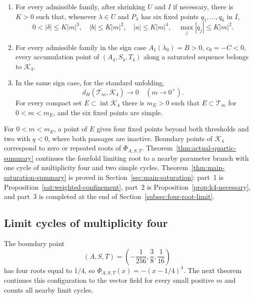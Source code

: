 \begin{theorem}\label{thm:main-saturation-summary}
\label{thm:k4-domain}
\begin{enumerate}
\item For every admissible family, after shrinking $U$ and $I$ if necessary,
there is $K>0$ such that, whenever
$\lambda\in U$ and $P_\lambda$ has six fixed points $q_1,\dots,q_6$ in $I$,
\[
 0<|\delta|\le K|m|^3,\quad |b|\le K|m|^2,
 \quad |a|\le K|m|^4,\quad \max_j|q_j|\le K|m|^2.
\]
\item For every admissible family in the sign case $A_1(\lambda_0)=B>0$,
$c_0=-C<0$, every accumulation point of $(A_4,S_4,T_4)$ along a saturated
sequence belongs to $\mathcal K_4$.
\item In the same sign case, for the standard unfolding,
\[
 d_H(\overline{\mathscr T_m},\mathcal K_4)\longrightarrow0\quad(m\to0^+).
\]
For every compact set $E\subset\operatorname{int}\mathcal K_4$ there is
$m_E>0$ such that $E\subset\mathscr T_m$ for $0<m<m_E$, and the six fixed
points are simple.
\end{enumerate}
\end{theorem}

For $0<m<m_E$, a point of $E$ gives four fixed points beyond both thresholds
and two with $q<0$, where both passages are inactive. Boundary points of
$\mathcal K_4$ correspond to zero or repeated roots of $\Phi_{A,S,T}$.
Theorem~\ref{thm:actual-quartic-summary} continues the fourfold limiting root
to a nearby parameter branch with one cycle of multiplicity four and two
simple cycles. Theorem~\ref{thm:main-saturation-summary} is proved in
Section~\ref{sec:main-saturation}: part~1 is
Proposition~\ref{sat:weighted-confinement}, part~2 is
Proposition~\ref{prop:k4-necessary}, and part~3 is completed at the end of
Section~\ref{subsec:four-root-limit}.

\subsection{Limit cycles of multiplicity four}

The boundary point
\[
 (A,S,T)=\left(-\frac1{256},\frac38,\frac1{16}\right)
\]
has four roots equal to $1/4$, so $\Phi_{A,S,T}(x)=-(x-1/4)^4$. The next
theorem continues this configuration to the vector field for every small
positive $m$ and counts all nearby limit cycles.

